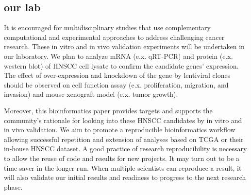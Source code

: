 \documentclass[jpm,article,submit,moreauthors,pdftex]{Definitions/mdpi}
\begin{document}
\begin{paracol}{2}
\subsection{our lab}
It is encouraged for multidisciplinary studies that use complementary computational and experimental approaches to address challenging cancer research.
These in vitro and in vivo validation experiments will be undertaken in our laboratory.
We plan to analyze mRNA (e.x. qRT-PCR) and protein (e.x. western blot) of HNSCC cell lysate to confirm the candidate genes' expression.
The effect of over-expression and knockdown of the gene by lentiviral clones should be observed on cell function assay (e.x. proliferation, migration, and invasion) and mouse xenograft model (e.x. tumor growth). %

Moreover, this bioinformatics paper provides targets and supports the community's rationale for looking into these HNSCC candidates by in vitro and in vivo validation. %
We aim to promote a reproducible bioinformatics\cite{Preeyanon2014}\cite{Kulkarni2018} workflow allowing successful repetition and extension of analyses based on TCGA or their in-house HNSCC dataset. %
A good practice of research reproducibility is necessary to allow the reuse of code and results for new projects.
It may turn out to be a time-saver in the longer run.
When multiple scientists can reproduce a result, it will also validate our initial results and readiness to progress to the next research phase. 


\end{paracol}
\end{document}
